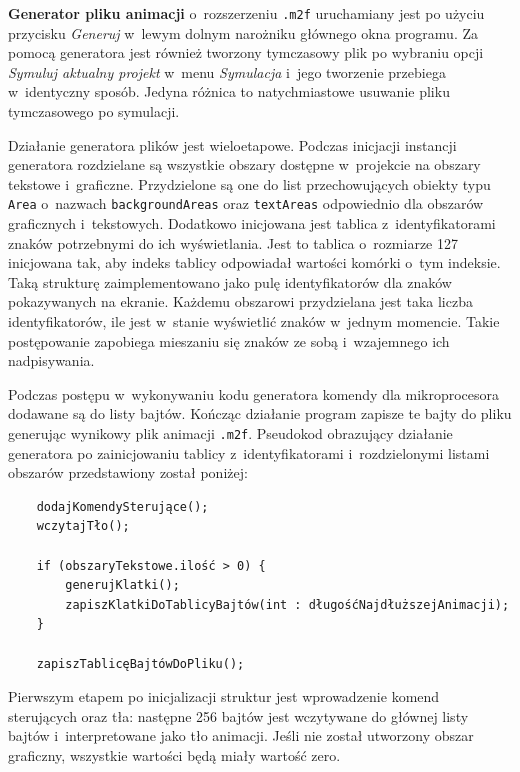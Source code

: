 
\textbf{Generator pliku animacji} o~rozszerzeniu \texttt{.m2f} uruchamiany jest po użyciu przycisku \textit{Generuj} w~lewym dolnym narożniku głównego okna programu. Za pomocą generatora jest również tworzony tymczasowy plik po wybraniu opcji \textit{Symuluj aktualny projekt} w~menu \textit{Symulacja} i~jego tworzenie przebiega w~identyczny sposób. Jedyna różnica to natychmiastowe usuwanie pliku tymczasowego po symulacji.

Działanie generatora plików jest wieloetapowe. Podczas inicjacji instancji generatora rozdzielane są wszystkie obszary dostępne w~projekcie na obszary tekstowe i~graficzne. Przydzielone są one do list przechowujących obiekty typu \texttt{Area} o~nazwach \texttt{backgroundAreas} oraz \texttt{textAreas} odpowiednio dla obszarów graficznych i~tekstowych. Dodatkowo inicjowana jest tablica z~identyfikatorami znaków potrzebnymi do ich wyświetlania. Jest to tablica o~rozmiarze 127 inicjowana tak, aby indeks tablicy odpowiadał wartości komórki o~tym indeksie. Taką strukturę zaimplementowano jako pulę identyfikatorów dla znaków pokazywanych na ekranie. Każdemu obszarowi przydzielana jest taka liczba identyfikatorów, ile jest w~stanie wyświetlić znaków w~jednym momencie. Takie postępowanie zapobiega mieszaniu się znaków ze sobą i~wzajemnego ich nadpisywania.

Podczas postępu w~wykonywaniu kodu generatora komendy dla mikroprocesora dodawane są do listy bajtów. Kończąc działanie program zapisze te bajty do pliku generując wynikowy plik animacji \texttt{.m2f}. Pseudokod obrazujący działanie generatora po zainicjowaniu tablicy z~identyfikatorami i~rozdzielonymi listami obszarów przedstawiony został poniżej:
\newpage
\begin{verbatim}
    dodajKomendySterujące();
    wczytajTło();

    if (obszaryTekstowe.ilość > 0) {
        generujKlatki();
        zapiszKlatkiDoTablicyBajtów(int : długośćNajdłuższejAnimacji);
    }

    zapiszTablicęBajtówDoPliku();
\end{verbatim}

Pierwszym etapem po inicjalizacji struktur jest wprowadzenie komend sterujących oraz tła: następne 256 bajtów jest wczytywane do głównej listy bajtów i~interpretowane jako tło animacji. Jeśli nie został utworzony obszar graficzny, wszystkie wartości będą miały wartość zero.

